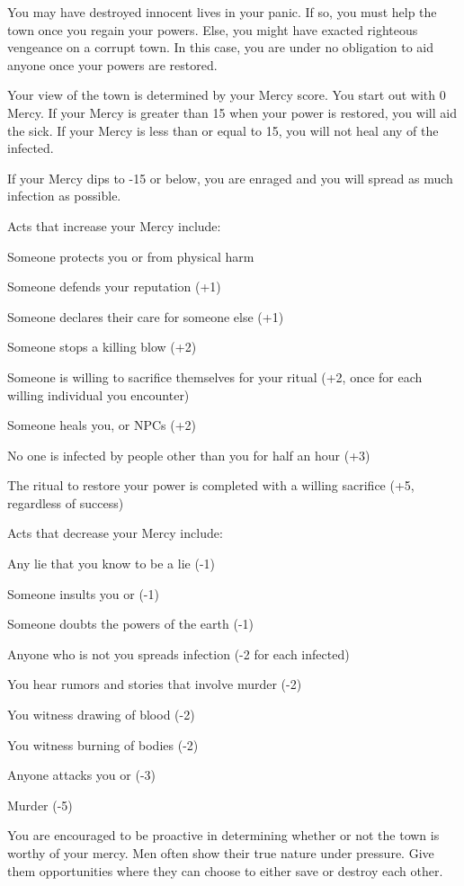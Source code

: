 \documentclass[green]{Pestilence}
\begin{document}
\name{\gMercy{}}

You may have destroyed innocent lives in your panic. If so, you must help the town once you regain your powers. Else, you might have exacted righteous vengeance on a corrupt town. In this case, you are under no obligation to aid anyone once your powers are restored.

Your view of the town is determined by your Mercy score. You start out with 0 Mercy. If your Mercy is greater than 15 when your power is restored, you will aid the sick. If your Mercy is less than or equal to 15, you will not heal any of the infected. 

If your Mercy dips to -15 or below, you are enraged and you will spread as much infection as possible.

Acts that increase your Mercy include:

\begin{itemz}
	\item Someone protects you or \cShaman{} from physical harm
	\item Someone defends your reputation (+1)
	\item Someone declares their care for someone else (+1)
	\item Someone stops a killing blow (+2)
	\item Someone is willing to sacrifice themselves for your ritual (+2, once for each willing individual you encounter)
	\item Someone heals you, \cShaman{} or NPCs (+2)
	\item No one is infected by people other than you for half an hour (+3)
	\item The ritual to restore your power is completed with a willing sacrifice (+5, regardless of success)
\end{itemz}

Acts that decrease your Mercy include:

\begin{itemz}
	\item Any lie that you know to be a lie (-1)
	\item Someone insults you or \cShaman{} (-1)
	\item Someone doubts the powers of the earth (-1)
	\item Anyone who is not you spreads infection (-2 for each infected)
	\item You hear rumors and stories that involve murder (-2)
	\item You witness drawing of blood (-2)
	\item You witness burning of bodies (-2)
	\item Anyone attacks you or \cShaman{} (-3)
	\item Murder (-5)
\end{itemz}

You are encouraged to be proactive in determining whether or not the town is worthy of your mercy. Men often show their true nature under pressure. Give them opportunities where they can choose to either save or destroy each other.
\end{document}
